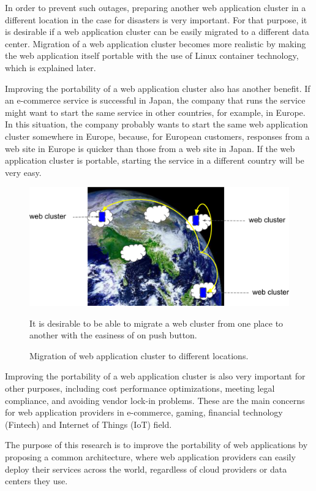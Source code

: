 In order to prevent such outages, preparing another web application cluster in a different location in the case for disasters is very important.
For that purpose, it is desirable if a web application cluster can be easily migrated to a different data center.
Migration of a web application cluster becomes more realistic by making the web application itself portable with the use of Linux container technology, which is explained later.

Improving the portability of a web application cluster also has another benefit.
If an e-commerce service is successful in Japan, the company that runs the service might want to start the same service in other countries, for example, in Europe.
In this situation, the company probably wants to start the same web application cluster somewhere in Europe, because, for European customers, responses from a web site in Europe is quicker than those from a web site in Japan.
If the web application cluster is portable, starting the service in a different country will be very easy.

\begin{figure}[h]
\begin{center}
\includegraphics[width=0.7\columnwidth]{Figs/earth}
\end{center}
\caption{
Migration of web application cluster to different locations.
}
\centering\parbox[c]{0.9\columnwidth}{
It is desirable to be able to migrate a web cluster from one place to another with the easiness of on push button.
}
\label{fig:earth}
\end{figure}

Improving the portability of a web application cluster is also very important for other purposes, including cost performance optimizations, meeting legal compliance, and avoiding vendor lock-in problems.
These are the main concerns for web application providers in e-commerce, gaming, financial technology (Fintech) and Internet of Things (IoT) field.

The purpose of this research is to improve the portability of web applications by proposing a common architecture, where web application providers can easily deploy their services across the world, regardless of cloud providers or data centers they use.

